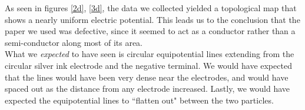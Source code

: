 \documentclass[oneside,12pt]{amsart}
\begin{document}
		\indent As seen in figures \ref{2d}, \ref{3d}, the data we collected yielded a topological map that shows a nearly uniform electric potential. This leads us to the conclusion that the paper we used was defective, since it seemed to act as a conductor rather than a semi-conductor along most of its area.\\
		
		\indent What we \textit{expected} to have seen is circular equipotential lines extending from the circular silver ink electrode and the negative terminal. We would have expected that the lines would have been very dense near the electrodes, and would have spaced out as the distance from any electrode increased. Lastly, we would have expected the equipotential lines to ``flatten out" between the two particles.\\
		
\end{document}
